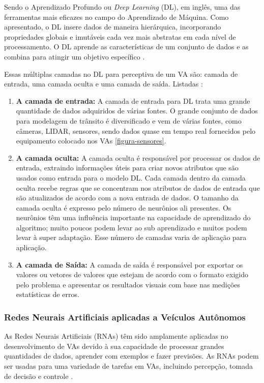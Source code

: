 Sendo o Aprendizado Profundo ou \textit{Deep Learning} (DL), em inglês, uma das ferramentas mais eficazes no campo do Aprendizado de Máquina. Como apresentado, o DL insere dados de maneira hierárquica, incorporando propriedades globais e imutáveis cada vez mais abstratas em cada nível de processamento. O DL aprende as características de um conjunto de dados e as combina para atingir um objetivo específico \cite{software-cnn}.

Essas múltiplas camadas no DL para perceptiva de um VA são: camada de entrada, uma camada oculta e uma camada de saída. Listadas \cite{software-ia}:

\begin{enumerate}
 \item \textbf{A camada de entrada:} A camada de entrada para DL trata uma grande quantidade de dados adquiridos de várias fontes. O grande conjunto de dados para modelagem de trânsito é diversificado e vem de várias fontes, como câmeras, LIDAR, sensores, sendo dados quase em tempo real fornecidos pelo equipamento colocado nos VAs \ref{figura-sensores}.
\item \textbf{A camada oculta:} A camada oculta é responsável por processar os dados de entrada, extraindo informações úteis para criar novos atributos que são usados como entrada para o modelo DL. Cada camada dentro da camada oculta recebe regras que se concentram nos atributos de dados de entrada que são atualizados de acordo com a nova entrada de dados. O tamanho da camada oculta é expresso pelo número de neurônios ali presentes. Os neurônios têm uma influência importante na capacidade de aprendizado do algoritmo; muito poucos podem levar ao sub aprendizado e muitos podem levar à super adaptação. Esse número  de camadas varia de aplicação para aplicação.
\item \textbf{A camada de Saída:} A camada de saída é responsável por exportar os valores ou vetores de valores que estejam de acordo com o formato exigido pelo problema e apresentar os resultados visuais com base nas medições estatísticas de erros.
\end{enumerate}

\subsubsection{Redes Neurais Artificiais aplicadas a Veículos Autônomos}

As Redes Neurais Artificiais (RNAs) têm sido amplamente aplicadas no desenvolvimento de VAs devido à sua capacidade de processar grandes quantidades de dados, aprender com exemplos e fazer previsões. As RNAs podem ser usadas para uma variedade de tarefas em VAs, incluindo percepção, tomada de decisão e controle \cite{sensors-yet}. 


